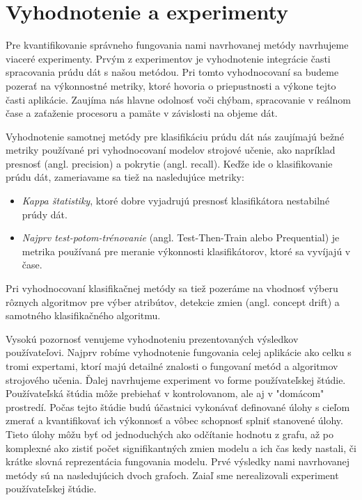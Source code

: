 \chapter{Vyhodnotenie a experimenty}
Pre kvantifikovanie správneho fungovania nami navrhovanej metódy navrhujeme viaceré experimenty. Prvým z experimentov je vyhodnotenie integrácie časti spracovania prúdu dát s našou metódou. Pri tomto vyhodnocovaní sa budeme pozerať na výkonnostné metriky, ktoré hovoria o priepustnosti a výkone tejto časti aplikácie. Zaujíma nás hlavne odolnosť voči chýbam, spracovanie v reálnom čase a zaťaženie procesoru a pamäte v závislosti na objeme dát.
\par
Vyhodnotenie samotnej metódy pre klasifikáciu prúdu dát nás zaujímajú bežné metriky používané pri vyhodnocovaní modelov strojové učenie, ako napríklad presnosť (angl. precision) a pokrytie (angl. recall). Keďže ide o klasifikovanie prúdu dát, zameriavame sa tiež na nasledujúce metriky:
\begin{itemize}
	\item \textit{Kappa štatistiky}, ktoré dobre vyjadrujú presnosť klasifikátora nestabilné prúdy dát.
	\item \textit{Najprv test-potom-trénovanie} (angl. Test-Then-Train alebo Prequential) je metrika používaná pre meranie výkonnosti klasifikátorov, ktoré sa vyvíjajú v čase.
\end{itemize}
Pri vyhodnocovaní klasifikačnej metódy sa tiež pozeráme na vhodnosť výberu rôznych algoritmov pre výber atribútov, detekcie zmien (angl. concept drift) a samotného klasifikačného algoritmu.
\par
Vysokú pozornosť venujeme vyhodnoteniu prezentovaných výsledkov používateľovi. Najprv robíme vyhodnotenie fungovania celej aplikácie ako celku s tromi expertami, ktorí majú detailné znalosti o fungovaní metód a algoritmov strojového učenia. Ďalej navrhujeme experiment vo forme používateľskej štúdie. Používateľská štúdia môže prebiehať v kontrolovanom, ale aj v "domácom" prostredí. Počas tejto štúdie budú účastnici vykonávať definované úlohy s cieľom zmerať a kvantifikovať ich výkonnosť a vôbec schopnosť splniť stanovené úlohy. Tieto úlohy môžu byť od jednoduchých ako odčítanie hodnotu z grafu, až po komplexné ako zistiť počet signifikantných zmien modelu a ich čas kedy nastali, či krátke slovná reprezentácia fungovania modelu. Prvé výsledky nami navrhovanej metódy sú na nasledujúcich dvoch grafoch. Zaiaľ sme nerealizovali experiment používateľskej štúdie.
\label{fig:exp-vis-concepts}
\label{fig:exp-vis-errors}

